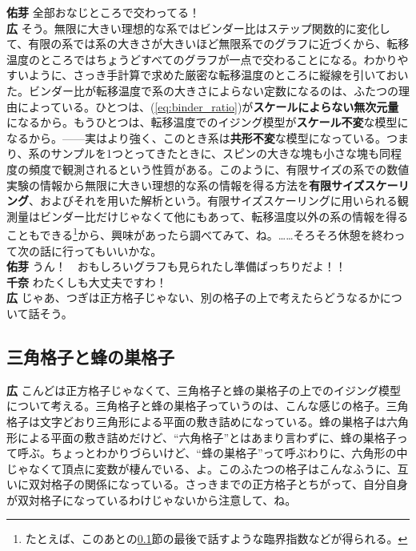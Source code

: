 \documentclass[paper=b5j,fontsize=12Q,jafontsize=12Q,baselineskip=21Q]{jlreq}
\DeclareRobustCommand{\hiron}{\textbf{広 }}
\DeclareRobustCommand{\chinan}{\textbf{千奈 }}
\DeclareRobustCommand{\umen}{\textbf{佑芽 }}
\begin{document}
\begin{refsection}
\umen 全部おなじところで交わってる！
\\\hiron そう。無限に大きい理想的な系ではビンダー比はステップ関数的に変化して、有限の系では系の大きさが大きいほど無限系でのグラフに近づくから、転移温度のところではちょうどすべてのグラフが一点で交わることになる。わかりやすいように、さっき手計算で求めた厳密な転移温度のところに縦線を引いておいた。ビンダー比が転移温度で系の大きさによらない定数になるのは、ふたつの理由によっている。ひとつは、(\ref{eq:binder_ratio})が\textbf{スケールによらない無次元量}になるから。もうひとつは、転移温度でのイジング模型が\textbf{スケール不変}な模型になるから。------実はより強く、このとき系は\textbf{共形不変}な模型になっている。つまり、系のサンプルを1つとってきたときに、スピンの大きな塊も小さな塊も同程度の頻度で観測されるという性質がある。このように、有限サイズの系での数値実験の情報から無限に大きい理想的な系の情報を得る方法を\textbf{有限サイズスケーリング}、およびそれを用いた解析という。有限サイズスケーリングに用いられる観測量はビンダー比だけじゃなくて他にもあって、転移温度以外の系の情報を得ることもできる\footnote{たとえば、このあとの\ref{subsection:triangle_and_honeycomb_lattice_ising}節の最後で話すような臨界指数などが得られる。}から、興味があったら調べてみて、ね。……そろそろ休憩を終わって次の話に行ってもいいかな。
\\\umen うん！　おもしろいグラフも見られたし準備ばっちりだよ！！
\\\chinan わたくしも大丈夫ですわ！
\\\hiron じゃあ、つぎは正方格子じゃない、別の格子の上で考えたらどうなるかについて話そう。

\subsection{三角格子と蜂の巣格子}
\label{subsection:triangle_and_honeycomb_lattice_ising}
\hiron こんどは正方格子じゃなくて、三角格子と蜂の巣格子の上でのイジング模型について考える。三角格子と蜂の巣格子っていうのは、こんな感じの格子。三角格子は文字どおり三角形による平面の敷き詰めになっている。蜂の巣格子は六角形による平面の敷き詰めだけど、``六角格子''とはあまり言わずに、蜂の巣格子って呼ぶ。ちょっとわかりづらいけど、``蜂の巣格子''って呼ぶわりに、六角形の中じゃなくて頂点に変数が棲んでいる、よ。このふたつの格子はこんなふうに、互いに双対格子の関係になっている。さっきまでの正方格子とちがって、自分自身が双対格子になっているわけじゃないから注意して、ね。

\begin{center}
\end{center}
\end{refsection}
\end{document}
